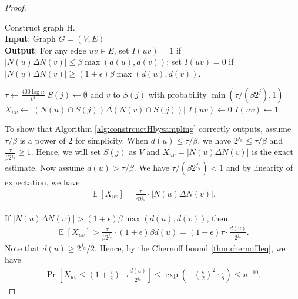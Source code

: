 \documentclass[11pt]{article}
\DeclareMathOperator*{\E}{{\mathbb{E}}}
\begin{document}
\begin{CJK*}{UTF8}{gbsn}
\begin{proof}
\begin{algorithm}[ht!]
\caption{Construct graph H.\\
\textbf{Input}: Graph $G = (V, E)$\\
\textbf{Output}: For any edge $uv \in E$, set $I(uv) = 1$ if $|N(u) \Delta N(v)| \leq \beta \max(d(u), d(v))$; set $I(uv) = 0$ if $|N(u) \Delta N(v)| \geq (1+\epsilon)\beta \max(d(u), d(v))$. }
\label{alg:constrcuctHbysampling}
\begin{algorithmic}[1]
    \State $\tau \leftarrow \frac{400 \log n}{\epsilon^2}$
    \label{alg:AllNormCCBySamplingsetlpvaluestart-1}
    \State $ S(j) \leftarrow \emptyset$
     add $v$ to $S(j)$ with probability $\min(\tau / (\beta2^j), 1)$
    \EndFor
     
    \State $X_{uv} \leftarrow |(N(u) \cap S(j)) \Delta (N(v) \cap S(j))|$
        \State $I(uv) \leftarrow 0$
    \Else
    \State $I(uv) \leftarrow 1$
    \EndIf
    \EndIf
    \EndFor
    \EndFor
    \EndFunction
\end{algorithmic}
\end{algorithm}

To show that Algorithm \ref{alg:constrcuctHbysampling} correctly outputs, assume $\tau / \beta$ is a power of 2 for simplicity. When $d(u) \leq \tau / \beta$, we have $2^{j_u} \leq \tau / \beta$ and $\frac{\tau}{\beta 2^{j_u}} \geq 1$. Hence, we will set $S(j)$ as $V$ and $X_{uv} = |N(u) \Delta N(v)|$ is the exact estimate. Now assume $d(u) > \tau / \beta$. We have $\tau / (\beta 2^{j_u}) < 1$ and by linearity of expectation, we have
\begin{align*}
    \E[X_{uv}] = \frac{\tau}{\beta 2^{j_u}} \cdot |N(u) \Delta N(v)|.
\end{align*}

If $|N(u) \Delta N(v)| > (1 + \epsilon)\beta \max(d(u), d(v))$, then 
\begin{align*}
    \E[X_{uv}] > \frac{\tau}{\beta 2^{j_u}} \cdot (1 + \epsilon)\beta d(u) = (1 + \epsilon) \tau \cdot \frac{d(u)}{2^{j_u}}.
\end{align*}
Note that $d(u) \geq 2^{j_u} / 2$. Hence, by the Chernoff bound \ref{thm:chernoffleq}, we have 
\begin{align*}
    \Pr[X_{uv} \leq (1 + \frac{\epsilon}{2}) \cdot \tau \frac{d(u)}{2^{j_u}}] \leq \exp\left(-\left(\frac{\epsilon}{2}\right)^2 \cdot \frac{\tau}{8}\right) \leq n^{-10}.
\end{align*}


\end{proof}
\end{CJK*}
\end{document}
